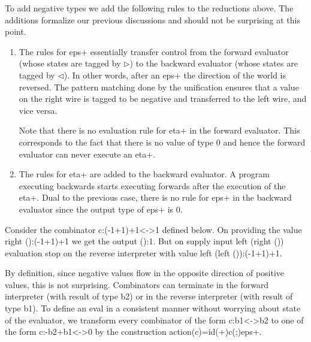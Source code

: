 \documentclass[preprint]{sigplanconf}
\begin{document}
To add negative types we add the following rules to the
  reductions above. The additions formalize our previous discussions
  and should not be surprising at this point.

  \begin{enumerate}
  \item The rules for {{eps+}} essentially transfer control from the
    forward evaluator (whose states are tagged by $\triangleright$) to
    the backward evaluator (whose states are tagged by
    $\triangleleft$). In other words, after an {{eps+}} the direction
    of the world is reversed. The pattern matching done by the
    unification ensures that a value on the {{right}} wire is tagged
    to be negative and transferred to the {{left}} wire, and vice versa.


    Note that there is no evaluation rule for {{eta+}} in the forward
    evaluator. This corresponds to the fact that there is no value of
    type {{0}} and hence the forward evaluator can never execute an
    {{eta+}}.

    \item The rules for {{eta+}} are added to the backward evaluator. A
      program executing backwards starts executing forwards after the
      execution of the {{eta+}}. Dual to the previous case, there is
      no rule for {{eps+}} in the backward evaluator since the output
      type of {{eps+}} is {{0}}.

  \end{enumerate}

Consider the combinator {{c:(-1+1)+1<->1}} defined below. On providing
the value {{right ():(-1+1)+1}} we get the output {{():1}}. But on
supply input {{left (right ())}} evaluation stop on the reverse
interpreter with value {{left (left ()):(-1+1)+1}}.

By definition, since negative values flow in the opposite direction of
positive values, this is not surprising. Combinators can terminate in
the forward interpreter (with result of type {{b2}}) or in the reverse
interpreter (with result of type {{b1}}). To define an {{eval}} in a
consistent manner without worrying about state of the evaluator, we
transform every combinator of the form {{c:b1<->b2}} to one of the
form {{c:-b2+b1<->0}} by the construction {{action(c)=id(+)c(;)eps+}}. 
\end{document}
